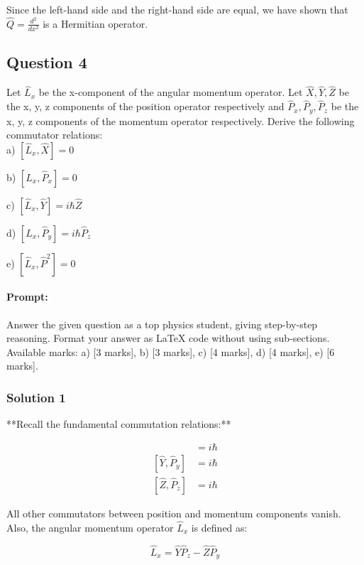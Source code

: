 \documentclass{article}
\begin{document}
Since the left-hand side and the right-hand side are equal, we have shown that $\hat{Q} = \frac{d^2}{dx^2}$ is a Hermitian operator.


\subsection{Question 4}

Let $\hat{L}_x$ be the x-component of the angular momentum operator. Let $\hat{X}, \hat{Y}, \hat{Z}$ be the x, y, z components of the position operator respectively and $\hat{P}_x, \hat{P}_y, \hat{P}_z$ be the x, y, z components of the momentum operator respectively. Derive the following commutator relations:   \\

a) $\left[\hat{L}_x, \hat{X}\right] = 0$  

b) $\left[\hat{L}_x, \hat{P}_x\right] = 0$  

c) $\left[\hat{L}_x, \hat{Y}\right] = i\hbar \hat{Z}$  

d) $\left[\hat{L}_x, \hat{P}_y\right] = i\hbar \hat{P}_z$  

e) $\left[\hat{L}_x, \hat{P}^2\right] = 0$

\paragraph{Prompt: \\} 
Answer the given question as a top physics student, giving step-by-step reasoning. Format your answer as LaTeX code without using sub-sections. Available marks: a) [3 marks], b) [3 marks], c) [4 marks], d) [4 marks], e) [6 marks].

\subsubsection{Solution 1}
**Recall the fundamental commutation relations:**

\begin{align*}
[\hat{X}, \hat{P}_x] &= i\hbar \\
[\hat{Y}, \hat{P}_y] &= i\hbar \\
[\hat{Z}, \hat{P}_z] &= i\hbar
\end{align*}

All other commutators between position and momentum components vanish. Also, the angular momentum operator $\hat{L}_x$ is defined as:

\begin{equation*}
\hat{L}_x = \hat{Y}\hat{P}_z - \hat{Z}\hat{P}_y
\end{equation*}
\end{document}
